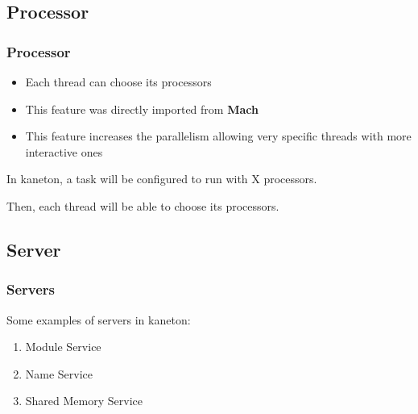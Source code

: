 %
%

\subsection{Processor}


\begin{frame}
  \frametitle{Processor}

  \begin{itemize}
    \item
      Each thread can choose its processors
    \item
      This feature was directly imported from \textbf{Mach}
    \item
      This feature increases the parallelism allowing very
      specific threads with more interactive ones
  \end{itemize}

  In kaneton, a task will be configured to run with X processors.

  \nl

  Then, each thread will be able to choose its processors.
\end{frame}

%
%

\subsection{Server}


\begin{frame}
  \frametitle{Servers}

  Some examples of servers in kaneton:

  \begin{enumerate}
    \item
      Module Service
    \item
      Name Service
    \item
      Shared Memory Service
  \end{enumerate}
\end{frame}


